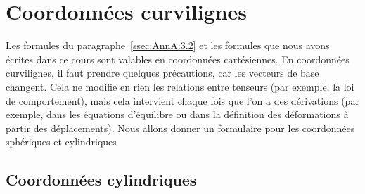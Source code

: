 \section{Coordonnées curvilignes}
Les formules du paragraphe~\ref{ssec:AnnA:3.2} et les formules que nous avons écrites dans ce cours sont valables en coordonnées cartésiennes.
En coordonnées curvilignes, il faut prendre quelques précautions, car les vecteurs de base changent.
Cela ne modifie en rien les relations entre tenseurs (par exemple, la loi de comportement), mais cela intervient chaque fois que l'on a des dérivations (par exemple, dans les équations d'équilibre ou dans la définition des déformations à partir des déplacements).
Nous allons donner un formulaire pour les coordonnées sphériques et cylindriques 

\subsection{Coordonnées cylindriques}

